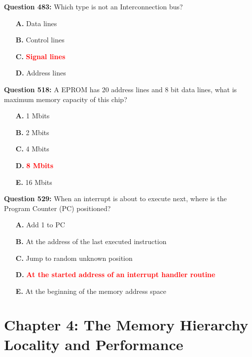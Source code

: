 \documentclass[12pt,a4paper]{article}
\begin{document}
\vspace{0.5cm}

\textbf{Question 483:} Which type is not an Interconnection bus?

\begin{itemize}
    \item[\textbf{A.}] Data lines
    \item[\textbf{B.}] Control lines
    \item[\textbf{C.}] \textcolor{red}{\textbf{Signal lines}}
    \item[\textbf{D.}] Address lines
\end{itemize}

\vspace{0.5cm}

\textbf{Question 518:} A EPROM has 20 address lines and 8 bit data lines, what is maximum memory capacity of this chip?

\begin{itemize}
    \item[\textbf{A.}] 1 Mbits
    \item[\textbf{B.}] 2 Mbits
    \item[\textbf{C.}] 4 Mbits
    \item[\textbf{D.}] \textcolor{red}{\textbf{8 Mbits}}
    \item[\textbf{E.}] 16 Mbits
\end{itemize}

\vspace{0.5cm}

\textbf{Question 529:} When an interrupt is about to execute next, where is the Program Counter (PC) positioned?

\begin{itemize}
    \item[\textbf{A.}] Add 1 to PC
    \item[\textbf{B.}] At the address of the last executed instruction
    \item[\textbf{C.}] Jump to random unknown position
    \item[\textbf{D.}] \textcolor{red}{\textbf{At the started address of an interrupt handler routine}}
    \item[\textbf{E.}] At the beginning of the memory address space
\end{itemize}

\vspace{0.5cm}

\section{Chapter 4: The Memory Hierarchy Locality and Performance}
\end{document}
